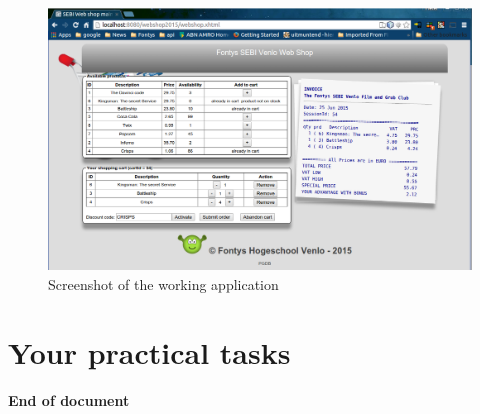 % 
\nolinenumbers
\begin{figure}[H]
\includegraphics[width=.9\linewidth]{figures/screenshot.png}
\caption{\label{fig:screenshot}Screenshot of the working application}
\end{figure}
\tableofcontents
\linenumbers





\afterpage{\clearpage}

\section{Your practical tasks}
%


\begin{center}
 \Large\bf End of document
\end{center}
\label{lastpage}
%
